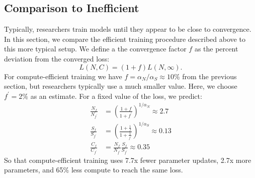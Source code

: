 \documentclass[english]{article}
\begin{document}
\subsection{Comparison to Inefficient}
Typically, researchers train models until they appear to be close to convergence. In this section, we compare the efficient training procedure described above to this more typical setup.
We define a the convergence factor $f$ as the percent deviation from the converged loss:
\begin{equation}
L\left(N,C\right)=\left(1+f\right)L\left(N,\infty\right).
\end{equation}
For compute-efficient training we have $f=\alpha_{N}/\alpha_{S}\approx10\%$ from the previous section, but researchers typically use a much smaller value. Here, we choose $f^{\prime}=2\%$ as an estimate.
For a fixed value of the loss, we predict:
\begin{align}
\frac{N_{f}}{N_{f^{\prime}}} & =\left(\frac{1+f}{1+f^{\prime}}\right)^{1/\alpha_{N}}\approx2.7\\
\frac{S_{f}}{S_{f^{\prime}}} & =\left(\frac{1+\frac{1}{f}}{1+\frac{1}{f^{\prime}}}\right)^{1/\alpha_{S}}\approx0.13\\
\frac{C_{f}}{C_{f^{\prime}}} & =\frac{N_{f}}{N_{f^{\prime}}}\frac{S_{f}}{S_{f^{\prime}}}\approx0.35
\end{align}
So that compute-efficient training uses 7.7x fewer parameter updates, 2.7x more parameters, and 65\% less compute to reach the same loss.
\end{document}
